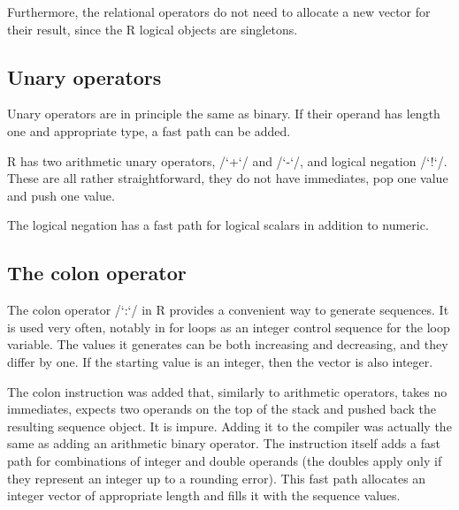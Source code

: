 Furthermore, the relational operators do not need to allocate a new vector for their result, since the R logical objects are singletons.



\subsection{Unary operators}

Unary operators are in principle the same as binary. If their operand has length one and appropriate type, a fast path can be added.

R has two arithmetic unary operators, \rinline/`+`/ and \rinline/`-`/, and logical negation \rinline/`!`/. These are all rather straightforward, they do not have immediates, pop one value and push one value.

The logical negation has a fast path for logical scalars in addition to numeric.


\subsection{The colon operator}

The colon operator \rinline/`:`/ in R provides a convenient way to generate sequences. It is used very often, notably in \todo[verb]for loops as an integer control sequence for the loop variable. The values it generates can be both increasing and decreasing, and they differ by one. If the starting value is an integer, then the vector is also integer.

The colon instruction was added that, similarly to arithmetic operators, takes no immediates, expects two operands on the top of the stack and pushed back the resulting sequence object. It is impure. Adding it to the compiler was actually the same as adding an arithmetic binary operator. The instruction itself adds a fast path for combinations of integer and double operands (the doubles apply only if they represent an integer up to a rounding error). This fast path allocates an integer vector of appropriate length and fills it with the sequence values.



